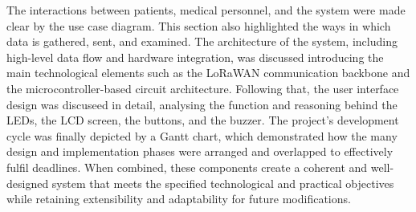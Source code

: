 The interactions between patients, medical personnel, and the system were made clear by the use case diagram. This section also highlighted the ways in which data is gathered, sent, and examined. The architecture of the system, including high-level data flow and hardware integration, was discussed introducing the main technological elements such as the LoRaWAN communication backbone and the microcontroller-based circuit architecture. Following that, the user interface design was discuseed in detail, analysing the function and reasoning behind the LEDs, the LCD screen, the buttons, and the buzzer. The project's development cycle was finally depicted by a Gantt chart, which demonstrated how the many design and implementation phases were arranged and overlapped to effectively fulfil deadlines. When combined, these components create a coherent and well-designed system that meets the specified technological and practical objectives while retaining extensibility and adaptability for future modifications.
